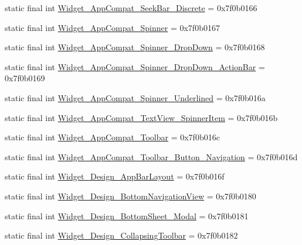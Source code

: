 \begin{CompactItemize}
\item 
static final int \hyperlink{classandroid_1_1support_1_1graphics_1_1drawable_1_1_r_1_1style_449e29ddaacef382d323cfc104efcf82}{Widget\_\-AppCompat\_\-SeekBar\_\-Discrete} = 0x7f0b0166
\item 
static final int \hyperlink{classandroid_1_1support_1_1graphics_1_1drawable_1_1_r_1_1style_b0dfb81530d8b2e4986d2050a2281e2f}{Widget\_\-AppCompat\_\-Spinner} = 0x7f0b0167
\item 
static final int \hyperlink{classandroid_1_1support_1_1graphics_1_1drawable_1_1_r_1_1style_b5f1ae6f4bb2db54770f336aa81f5cb1}{Widget\_\-AppCompat\_\-Spinner\_\-DropDown} = 0x7f0b0168
\item 
static final int \hyperlink{classandroid_1_1support_1_1graphics_1_1drawable_1_1_r_1_1style_f454bcd2d3b993ace06351bcc3959a74}{Widget\_\-AppCompat\_\-Spinner\_\-DropDown\_\-ActionBar} = 0x7f0b0169
\item 
static final int \hyperlink{classandroid_1_1support_1_1graphics_1_1drawable_1_1_r_1_1style_550ebfc8a0b6bf6fc66de8157d57c2f9}{Widget\_\-AppCompat\_\-Spinner\_\-Underlined} = 0x7f0b016a
\item 
static final int \hyperlink{classandroid_1_1support_1_1graphics_1_1drawable_1_1_r_1_1style_8b494ea4ec7ab7ce4b63e48428a3ae43}{Widget\_\-AppCompat\_\-TextView\_\-SpinnerItem} = 0x7f0b016b
\item 
static final int \hyperlink{classandroid_1_1support_1_1graphics_1_1drawable_1_1_r_1_1style_16ea257ad68d9b4744a6ef03ed14d01f}{Widget\_\-AppCompat\_\-Toolbar} = 0x7f0b016c
\item 
static final int \hyperlink{classandroid_1_1support_1_1graphics_1_1drawable_1_1_r_1_1style_d511be032e974d4d24bf1bb79b852cac}{Widget\_\-AppCompat\_\-Toolbar\_\-Button\_\-Navigation} = 0x7f0b016d
\item 
static final int \hyperlink{classandroid_1_1support_1_1graphics_1_1drawable_1_1_r_1_1style_a5d4133c23ff282c64ed2e95c5e521ea}{Widget\_\-Design\_\-AppBarLayout} = 0x7f0b016f
\item 
static final int \hyperlink{classandroid_1_1support_1_1graphics_1_1drawable_1_1_r_1_1style_6b16f25f076d09dc4a57880c08c582a1}{Widget\_\-Design\_\-BottomNavigationView} = 0x7f0b0180
\item 
static final int \hyperlink{classandroid_1_1support_1_1graphics_1_1drawable_1_1_r_1_1style_894a7b2e27655e6df14a03746fabb4c6}{Widget\_\-Design\_\-BottomSheet\_\-Modal} = 0x7f0b0181
\item 
static final int \hyperlink{classandroid_1_1support_1_1graphics_1_1drawable_1_1_r_1_1style_6b0a7249c7c00e3fc1fef5317d648ee3}{Widget\_\-Design\_\-CollapsingToolbar} = 0x7f0b0182

\end{CompactItemize}
